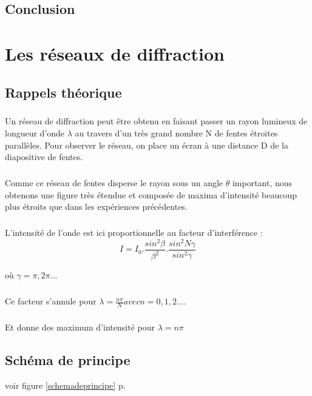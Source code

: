 \documentclass[11pt,a4paper]{report}
\begin{document}
	\section{Conclusion}
\chapter{Les réseaux de diffraction}
	\section{Rappels théorique}
\paragraph{}	
	Un réseau de diffraction peut être obtenu en faisant passer un rayon lumineux de longueur d'onde $\lambda$ au travers d'un très grand nombre N de fentes étroites parallèles. Pour observer le réseau, on place un écran à une distance D de la diapositive de fentes.
\paragraph{}
Comme ce réseau de fentes disperse le rayon sous un angle $\theta$ important, nous obtenons une figure très étendue et composée de maxima d'intensité beaucoup plus étroits que dans les expériences précédentes.
\paragraph{}
L'intensité de l'onde est ici proportionnelle  au facteur d'interférence :
\begin{equation}
I = I_{0}.\frac{sin^2 \beta}{\beta^2}.\frac{sin^2N\gamma}{sin^2 \gamma}
\end{equation}
\begin{center}
où $\gamma = \pi, 2\pi...$
\end{center}

\paragraph{}
Ce facteur s'annule pour $\lambda = \frac{n\pi} {N} avec n=0,1,2…. $
\paragraph{}
Et donne des maximum d’intensité pour $\lambda = n\pi$

	\section{Schéma de principe}
	voir figure \ref{schemadeprincipe} p.\pageref{schemadeprincipe}
\end{document}
